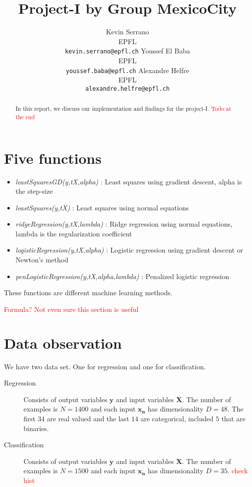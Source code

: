 \documentclass{article} %
\title{Project-I by Group MexicoCity}
\author{
Kevin Serrano\\EPFL\\
\texttt{kevin.serrano@epfl.ch} \And Youssef El Baba\\EPFL\\
\texttt{youssef.baba@epfl.ch} \And Alexandre Helfre\\EPFL\\
\texttt{alexandre.helfre@epfl.ch}
}
\begin{document}
\maketitle

\begin{abstract}
In this report, we discuss our implementation and findings for the project-I. \textcolor{red}{Todo at the end}


\end{abstract}
\section{Five functions}
\begin{itemize}
\item \textit{leastSquaresGD(y,tX,alpha)} : Least squares using gradient descent, alpha is the step-size
\item \textit{leastSquares(y,tX)} : Least squares using normal equations
\item \textit{ridgeRegression(y,tX,lambda)} : Ridge regression using normal equations, lambda is the regularization coefficient
\item \textit{logisticRegression(y,tX,alpha)} : Logistic regression using gradient descent or Newton's method
\item \textit{penLogisticRegression(y,tX,alpha,lambda)} : Penalized logistic regression 

\end{itemize}
These functions are different machine learning methods.

\textcolor{red}{Formula? Not even sure this section is useful}

\section{Data observation}
We have two data set. One for regression and one for classification. \begin{description}
\item[Regression] Consists of output variables $\mathbf{y}$ and input variables $\mathbf{X}$. The number of examples is $N = 1400$ and each input $\mathbf{x_n}$ has dimensionality $D = 48$. The first $34$ are real valued and the last $14$ are categorical, included $5$ that are binaries.
\item[Classification] Consists of output variables $\mathbf{y}$ and input variables $\mathbf{X}$. The number of examples is $N = 1500$ and each input $\mathbf{x_n}$ has dimensionality $D = 35$. \textcolor{red}{check hist}

\end{description}
\end{document}
